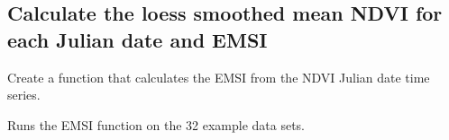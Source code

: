 \documentclass[
]{article}
\newenvironment{Shaded}{\begin{snugshade}}{\end{snugshade}}
\newcommand{\CommentTok}[1]{\textcolor[rgb]{0.56,0.35,0.01}{\textit{#1}}}
\newcommand{\ControlFlowTok}[1]{\textcolor[rgb]{0.13,0.29,0.53}{\textbf{#1}}}
\newcommand{\DataTypeTok}[1]{\textcolor[rgb]{0.13,0.29,0.53}{#1}}
\newcommand{\DecValTok}[1]{\textcolor[rgb]{0.00,0.00,0.81}{#1}}
\newcommand{\KeywordTok}[1]{\textcolor[rgb]{0.13,0.29,0.53}{\textbf{#1}}}
\newcommand{\NormalTok}[1]{#1}
\newcommand{\OperatorTok}[1]{\textcolor[rgb]{0.81,0.36,0.00}{\textbf{#1}}}
\newcommand{\StringTok}[1]{\textcolor[rgb]{0.31,0.60,0.02}{#1}}
\begin{document}
\hypertarget{calculate-the-loess-smoothed-mean-ndvi-for-each-julian-date-and-emsi}{%
\subsection{Calculate the loess smoothed mean NDVI for each Julian date
and
EMSI}\label{calculate-the-loess-smoothed-mean-ndvi-for-each-julian-date-and-emsi}}

Create a function that calculates the EMSI from the NDVI Julian date
time series.

\begin{Shaded}
\end{Shaded}

Runs the EMSI function on the 32 example data sets.
\end{document}
